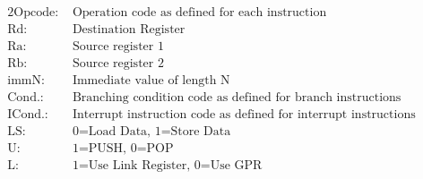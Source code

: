 \hspace{0pt}\\\\

\begingroup
\setlength{\abovedisplayskip}{0pt}
 \\
\begin{alignat*}{2}
	\text{Opcode:}& \text{ Operation code as defined for each instruction} \\
	\text{Rd:}& \text{ Destination Register} \\
	\text{Ra:}& \text{ Source register 1} \\
	\text{Rb:}& \text{ Source register 2} \\
	\text{immN:}& \text{ Immediate value of length N} \\
	\text{Cond.:}& \text{ Branching condition code as defined for branch instructions} \\
	\text{ICond.:}& \text{ Interrupt instruction code as defined for interrupt instructions} \\
	\text{LS:}& \text{ 0=Load Data, 1=Store Data} \\
	\text{U:}& \text{ 1=PUSH, 0=POP} \\
	\text{L:}& \text{ 1=Use Link Register, 0=Use GPR} \\
\end{alignat*}
\endgroup

